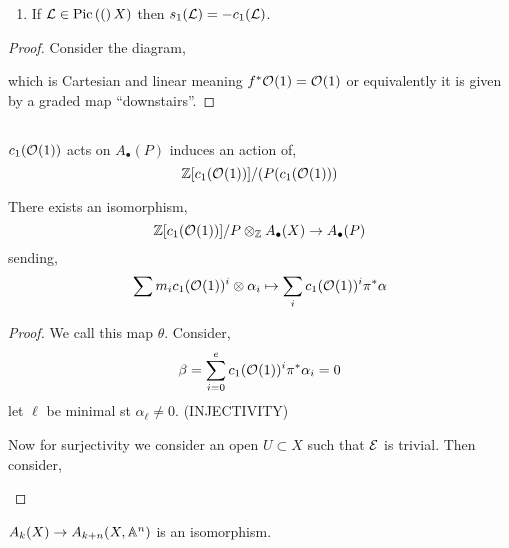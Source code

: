 \documentclass[12pt]{article}
\begin{document}
\begin{def}
{\begin{prop}
\begin{enumerate}
\item If $\mathcal{L} \in \mathrm{Pic} \left( ( \right)X)$ then $s_1(\mathcal{L}) = - c_1(\mathcal{L})$.
\end{enumerate}
\end{prop}

\begin{proof}
Consider the diagram,
\begin{center}
\end{center}
which is Cartesian and linear meaning $f^* \mathcal{O}_{}(1) = \mathcal{O}_{}(1)$ or equivalently it is given by a graded map ``downstairs''. 
\end{proof}

\subsection{}

$c_1(\mathcal{O}_{}(1))$ acts on $A_\bullet(P)$ induces an action of,
\[ \mathbb{Z}[ c_1(\mathcal{O}_{}(1)) ] / (P(c_1(\mathcal{O}_{}(1))) \]

\begin{theorem}
There exists an isomorphism,
\[ \mathbb{Z}[c_1(\mathcal{O}_{}(1))] / P \otimes_{\mathbb{Z}} A_\bullet(X) \to A_\bullet(P) \]
sending,
\[ \sum m_i c_1(\mathcal{O}_{}(1))^i \otimes \alpha_i \mapsto \sum_i c_1(\mathcal{O}_{}(1))^i \pi^* \alpha \]
\end{theorem}

\begin{proof}
We call this map $\theta$. Consider,
\[ \beta = \sum_{i = 0}^e c_1(\mathcal{O}_{}(1))^i \pi^* \alpha_i = 0 \]
let $\ell$ be minimal st $\alpha_\ell \neq 0$. 
(INJECTIVITY)

Now for surjectivity we consider an open $U \subset X$ such that $\mathcal{E}$ is trivial. Then consider,
\begin{center}
\end{center}

\end{proof}

\begin{cor}
$A_k(X) \to A_{k+n}(X, \mathbb{A}^n)$ is an isomorphism. 
\end{cor}

}
\end{def}
\end{document}
